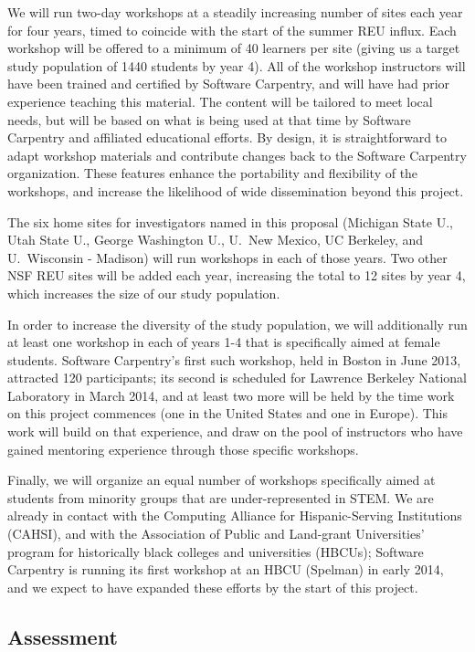 \documentclass[11pt]{article}
\begin{document}
We will run two-day workshops at a steadily increasing number of sites
each year for four years, timed to coincide with the start of the
summer REU influx.  Each workshop will be offered to a minimum of 40
learners per site (giving us a target study population of 1440
students by year 4).  All of the
workshop instructors will have been trained and certified by Software
Carpentry, and will have had prior experience teaching this material.
The content will be tailored to meet local
needs, but will be based on what is being used at that time by
Software Carpentry and affiliated educational efforts.  By design, it is straightforward to adapt workshop materials and contribute changes back to the Software Carpentry organization.  These features enhance the portability and flexibility of the workshops, and increase the likelihood of wide dissemination beyond this project.  

The six home sites for investigators named in this proposal (Michigan
State U., Utah State U., George Washington U., U.\ New Mexico, UC
Berkeley, and U.\ Wisconsin - Madison) will run workshops in each of
those years.  Two other NSF REU sites will be added each year,
increasing the total to 12 sites by year 4, which increases the size of our study population.

In order to increase the diversity of the study population, we will
additionally run at least one workshop in each of years 1-4 that is
specifically aimed at female students.  Software Carpentry's first
such workshop, held in Boston in June 2013, attracted 120
participants; its second is scheduled for Lawrence Berkeley National
Laboratory in March 2014, and at least two more will be held by the
time work on this project commences (one in the United States and one
in Europe).  This work will build on that experience, and draw on the
pool of instructors who have gained mentoring experience through those
specific workshops.

Finally, we will organize an equal number of workshops specifically
aimed at students from minority groups that are under-represented in
STEM.  We are already in contact with the Computing Alliance for
Hispanic-Serving Institutions (CAHSI), and with the Association of
Public and Land-grant Universities' program for historically black
colleges and universities (HBCUs); Software Carpentry is running its
first workshop at an HBCU (Spelman) in early 2014, and we expect to
have expanded these efforts by the start of this project.

\subsection{Assessment}
\end{document}
